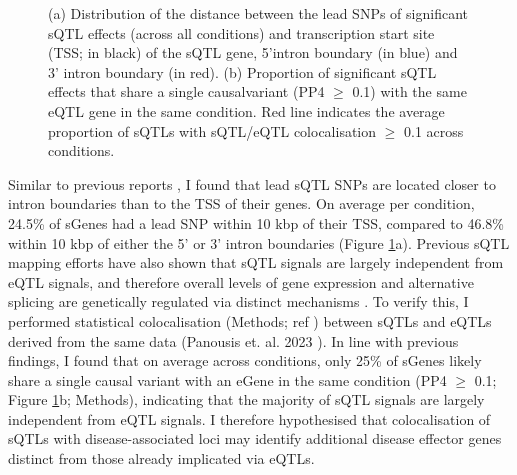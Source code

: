 \begin{figure}[H]
     \caption{(a) Distribution of the distance between the lead SNPs of significant sQTL effects (across all conditions) and transcription start site (TSS; in black) of the sQTL gene, 5'intron boundary (in blue) and 3' intron boundary (in red). (b) Proportion of significant sQTL effects that share a single causalvariant (PP4 $\geq$ 0.1) with the same eQTL gene in the same condition. Red line indicates the average proportion of sQTLs with sQTL/eQTL colocalisation $\geq$ 0.1 across conditions.}
     \label{fig:tss_esqtl}
\end{figure}
Similar to previous reports \cite{Garrido-Martin2021-sk}, I found that lead sQTL SNPs are located closer to intron boundaries than to the TSS of their genes. On average per condition, 24.5\% of sGenes had a lead SNP within 10 kbp of their TSS, compared to 46.8\% within 10 kbp of either the 5' or 3' intron boundaries (Figure \ref{fig:tss_esqtl}a). Previous sQTL mapping efforts have also shown that sQTL signals are largely independent from eQTL signals, and therefore overall levels of gene expression and alternative splicing are genetically regulated via distinct mechanisms \cite{Kim-Hellmuth2020-gz,Wang2008-fb,Lappalainen2013-mz}. To verify this, I performed statistical colocalisation (Methods; ref \cite{Giambartolomei2014-yl}) between sQTLs and eQTLs derived from the same data (Panousis et. al. 2023 \cite{macromap-eqtl}). In line with previous findings, I found that on average across conditions, only 25\% of sGenes likely share a single causal variant with an eGene in the same condition (PP4 $\geq$ 0.1; Figure \ref{fig:tss_esqtl}b; Methods), indicating that the majority of sQTL signals are largely independent from eQTL signals. I therefore hypothesised that colocalisation of sQTLs with disease-associated loci may identify additional disease effector genes distinct from those already implicated via eQTLs. \\




